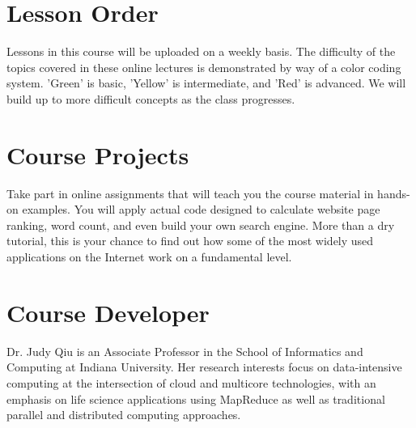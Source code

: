 \section{Lesson Order}
Lessons in this course will be uploaded on a weekly basis. The difficulty of
the topics covered in these online lectures is demonstrated by way of a color
coding system. 'Green' is basic, 'Yellow' is intermediate, and 'Red' is
advanced. We will build up to more difficult concepts as the class progresses.

\section{Course Projects}
Take part in online assignments that will teach you the course material in
hands-on examples. You will apply actual code designed to calculate website
page ranking, word count, and even build your own search engine. More than a
dry tutorial, this is your chance to find out how some of the most widely used
applications on the Internet work on a fundamental level.

\section{Course Developer}
Dr. Judy Qiu is an Associate Professor in the School of Informatics and
Computing at Indiana University. Her research interests focus on data-intensive
computing at the intersection of cloud and multicore technologies, with an
emphasis on life science applications using MapReduce as well as traditional
parallel and distributed computing approaches.

